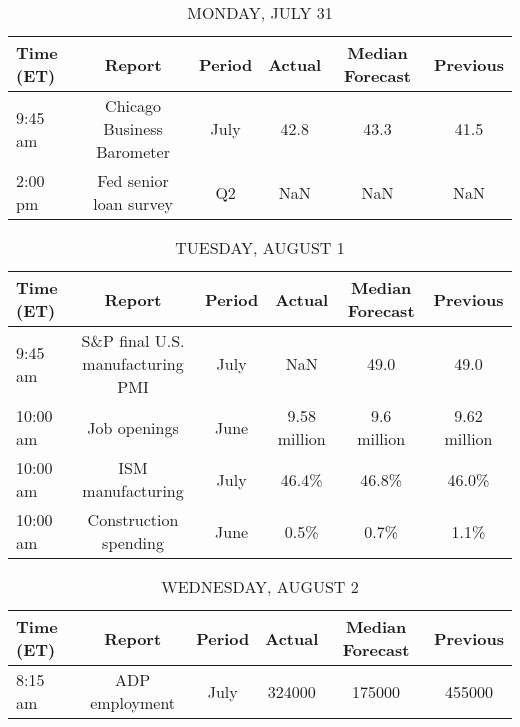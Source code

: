 \documentclass{article}%
\begin{document}
%
\normalsize%


\begin{table}[htbp]%
\caption{MONDAY, JULY 31}%
\centering%
\begin{adjustbox}{width=1\textwidth}%
\begin{tabular}{lccccc}
\toprule
Time (ET) &                     Report & Period & Actual & Median Forecast & Previous \\
\midrule
  9:45 am & Chicago Business Barometer &   July &   42.8 &            43.3 &     41.5 \\
  2:00 pm &     Fed senior loan survey &     Q2 &    NaN &             NaN &      NaN \\
\bottomrule
\end{tabular}
%
\end{adjustbox}%
\end{table}

%


\begin{table}[htbp]%
\caption{TUESDAY, AUGUST 1}%
\centering%
\begin{adjustbox}{width=1\textwidth}%
\begin{tabular}{lccccc}
\toprule
Time (ET) &                           Report & Period &       Actual & Median Forecast &     Previous \\
\midrule
  9:45 am & S\&P final U.S. manufacturing PMI &   July &          NaN &            49.0 &         49.0 \\
 10:00 am &                     Job openings &   June & 9.58 million &     9.6 million & 9.62 million \\
 10:00 am &                ISM manufacturing &   July &        46.4\% &           46.8\% &        46.0\% \\
 10:00 am &            Construction spending &   June &         0.5\% &            0.7\% &         1.1\% \\
\bottomrule
\end{tabular}
%
\end{adjustbox}%
\end{table}

%


\begin{table}[htbp]%
\caption{WEDNESDAY, AUGUST 2}%
\centering%
\begin{adjustbox}{width=1\textwidth}%
\begin{tabular}{lccccc}
\toprule
Time (ET) &         Report & Period & Actual & Median Forecast & Previous \\
\midrule
  8:15 am & ADP employment &   July & 324000 &          175000 &   455000 \\
\bottomrule
\end{tabular}
%
\end{adjustbox}%
\end{table}
\end{document}
